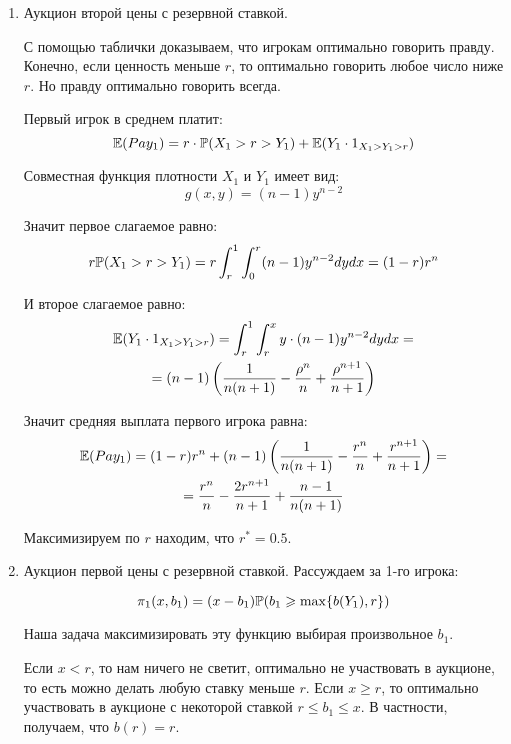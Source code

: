 \begin{enumerate}
\item Аукцион второй цены с резервной ставкой.

С помощью таблички доказываем, что игрокам оптимально говорить правду. Конечно, если ценность меньше $ r $, то оптимально говорить любое число ниже $ r $. Но правду оптимально говорить всегда.

Первый игрок в среднем платит:
\begin{equation}
\E(Pay_{1})=r\cdot \P(X_{1}>r>Y_{1})+\E(Y_{1}\cdot 1_{X_{1}>Y_{1}>r})
\end{equation}

Совместная функция плотности $ X_{1} $ и $ Y_{1} $ имеет вид:
\begin{equation}
g(x,y)=(n-1)y^{n-2}
\end{equation}

Значит первое слагаемое равно:
\begin{equation}
r\P(X_{1}>r>Y_{1})=r\int_{r}^{1}\int_{0}^{r} (n-1)y^{n-2} dy dx=(1-r)r^{n}
\end{equation}

И второе слагаемое равно:
\begin{multline} \label{E_Y_1XYr}
\E(Y_{1}\cdot 1_{X_{1}>Y_{1}>r})=\int_{r}^{1}\int_{r}^{x} y\cdot (n-1)y^{n-2} dy dx=\\
=(n-1)\left(\frac{1}{n(n+1)}-\frac{\rho^{n}}{n}+\frac{\rho^{n+1}}{n+1}\right)
\end{multline}

Значит средняя выплата первого игрока равна:
\begin{multline}
\E(Pay_{1})=(1-r)r^{n}+(n-1)\left(\frac{1}{n(n+1)}-\frac{r^{n}}{n}+\frac{r^{n+1}}{n+1}\right)=\\
=\frac{r^{n}}{n}-\frac{2r^{n+1}}{n+1}+\frac{n-1}{n(n+1)}
\end{multline}

Максимизируем по $ r $ находим, что $ r^{*}=0.5 $.


\item Аукцион первой цены с резервной ставкой. Рассуждаем за 1-го игрока:

\begin{equation}
\pi_{1}(x,b_{1})=(x-b_{1})\P(b_{1}\geq \max\{b(Y_{1}),r\})
\end{equation}

Наша задача максимизировать эту функцию выбирая произвольное $ b_{1} $.

Если $ x<r $, то нам ничего не светит, оптимально не участвовать в аукционе, то есть можно делать любую ставку меньше $ r $. Если $ x\geq r $, то оптимально участвовать в аукционе с некоторой ставкой $ r\leq b_{1}\leq x $. В частности, получаем, что $ b(r)=r$.



\end{enumerate}
